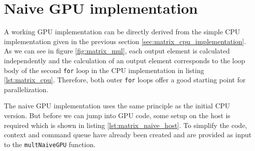 \section{Naive GPU implementation}
\label{sec:matrix_mul_naive}

A working GPU implementation can be directly derived from the simple CPU implementation given in the previous section \ref{sec:matrix_cpu_implementation}. As we can see in figure \ref{fig:matrix_mul}, each output element is calculated independently and the calculation of an output element corresponds to the loop body of the second \lstinline!for! loop in the CPU implementation in listing \ref{lst:matrix_cpu}. Therefore, both outer \lstinline!for! loops offer a good starting point for parallelization. 

The naive GPU implementation uses the same principle as the initial CPU version. But before we can jump into GPU code, some setup on the host is required which is shown in listing \ref{lst:matrix_naive_host}. To simplify the code, context and command queue have already been created and are provided as input to the \lstinline!multNaiveGPU! function.




